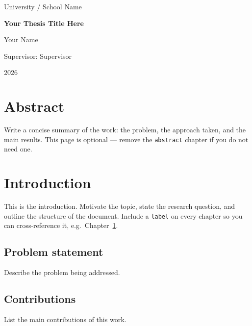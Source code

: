\documentclass[12pt,a4paper,oneside]{report}
\newcommand{\thesistitle}{Your Thesis Title Here}
\newcommand{\thesisauthor}{Your Name}
\newcommand{\thesisyear}{2026}
\newcommand{\thesissupervisor}{Supervisor}
\newcommand{\thesisschool}{University / School Name}
\begin{document}
\begin{titlepage}
  \centering
  \vspace*{2cm}
  {\large \thesisschool\par}
  \vspace{3cm}
  {\Huge\bfseries \thesistitle\par}
  \vspace{1.5cm}
  {\large \thesisauthor\par}
  \vspace{1cm}
  {\large Supervisor: \thesissupervisor\par}
  \vfill
  {\large \thesisyear\par}
\end{titlepage}

\chapter*{Abstract}

Write a concise summary of the work: the problem, the approach taken, and
the main results. This page is optional --- remove the \texttt{abstract}
chapter if you do not need one.

\tableofcontents
\newpage

\chapter{Introduction}
\label{ch:introduction}

This is the introduction. Motivate the topic, state the research question,
and outline the structure of the document. Include a \texttt{label} on
every chapter so you can cross-reference it, e.g.\ Chapter~\ref{ch:introduction}.

\section{Problem statement}
Describe the problem being addressed.

\section{Contributions}
List the main contributions of this work.
\end{document}
